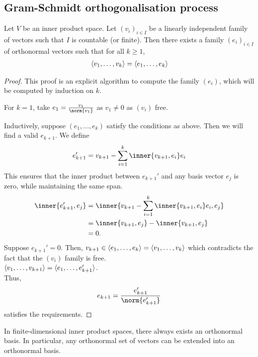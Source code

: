 \subsection{Gram-Schmidt orthogonalisation process}
\begin{theorem}
	Let $V$ be an inner product space.
	Let $(v_i)_{i \in I}$ be a linearly independent family of vectors such that $I$ is countable (or finite).
	Then there exists a family $(e_i)_{i \in I}$ of orthonormal vectors such that for all $k \geq 1$,
	\begin{align*}
		\langle{} v_1, \dots, v_k \rangle = \langle{} e_1, \dots, e_k \rangle
	\end{align*}
\end{theorem}
\begin{proof}
	This proof is an explicit algorithm to compute the family $(e_i)$, which will be computed by induction on $k$.

	For $k = 1$, take $e_1 = \frac{v_1}{\norm{v_1}}$ as $v_1 \neq 0$ as $(v_i)$ free.

	Inductively, suppose $(e_1, \dots, e_k)$ satisfy the conditions as above.
	Then we will find a valid $e_{k+1}$.
	We define
	\begin{align*}
		e_{k+1}' = v_{k+1} - \sum_{i=1}^k \inner{v_{k+1}, e_i} e_i
	\end{align*}
	This ensures that the inner product between $e_{k+1}'$ and any basis vector $e_j$ is zero, while maintaining the same span.
	\begin{align*}
		\inner{e_{k+1}', e_j} &= \inner{v_{k+1} - \sum_{i=1}^k \inner{v_{k+1}, e_i} e_i, e_j} \\
		&= \inner{v_{k+1}, e_j} - \inner{v_{k+1}, e_j} \\
		&= 0.
	\end{align*} 
	Suppose $e_{k+1}' = 0$.
	Then, $v_{k+1} \in \langle{} e_1, \dots, e_k \rangle = \langle{} v_1, \dots, v_k \rangle$ which contradicts the fact that the $(v_i)$ family is free. \\
	$\langle{} v_1, \dots, v_{k+1} \rangle = \langle{} e_1, \dots, e'_{k+1} \rangle$. \\
	Thus,
	\begin{align*}
		e_{k+1} = \frac{e_{k+1}'}{\norm{e_{k+1}'}}
	\end{align*}
	satisfies the requirements.
\end{proof}

\begin{corollary}
	In finite-dimensional inner product spaces, there always exists an orthonormal basis.
	In particular, any orthonormal set of vectors can be extended into an orthonormal basis.
\end{corollary}

